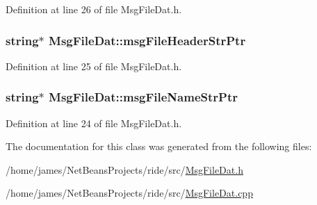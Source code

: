 Definition at line 26 of file Msg\-File\-Dat.\-h.

\hypertarget{class_msg_file_dat_a255d1a1881daf9f5d710c1c868c41a5b}{
\subsubsection[{msg\-File\-Header\-Str\-Ptr}]{\setlength{\rightskip}{0pt plus 5cm}string$\ast$ Msg\-File\-Dat\-::msg\-File\-Header\-Str\-Ptr\hspace{0.3cm}{\ttfamily [private]}}}\label{class_msg_file_dat_a255d1a1881daf9f5d710c1c868c41a5b}


Definition at line 25 of file Msg\-File\-Dat.\-h.

\hypertarget{class_msg_file_dat_a219fbb888679f6785c3351d949902a05}{
\subsubsection[{msg\-File\-Name\-Str\-Ptr}]{\setlength{\rightskip}{0pt plus 5cm}string$\ast$ Msg\-File\-Dat\-::msg\-File\-Name\-Str\-Ptr\hspace{0.3cm}{\ttfamily [private]}}}\label{class_msg_file_dat_a219fbb888679f6785c3351d949902a05}


Definition at line 24 of file Msg\-File\-Dat.\-h.



The documentation for this class was generated from the following files\-:\begin{DoxyCompactItemize}
\item 
/home/james/\-Net\-Beans\-Projects/ride/src/\hyperlink{_msg_file_dat_8h}{Msg\-File\-Dat.\-h}\item 
/home/james/\-Net\-Beans\-Projects/ride/src/\hyperlink{_msg_file_dat_8cpp}{Msg\-File\-Dat.\-cpp}\end{DoxyCompactItemize}
